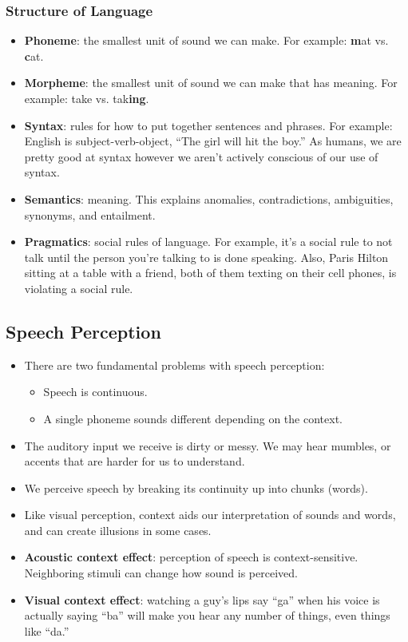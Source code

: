 \documentclass[]{article}
\begin{document}
			\subsubsection{Structure of Language}
				\begin{itemize}
					\item \textbf{Phoneme}: the smallest unit of sound we can make. For example: \textbf{m}at vs. \textbf{c}at.
					\item \textbf{Morpheme}: the smallest unit of sound we can make that has meaning. For example: take vs. tak\textbf{ing}.
					\item \textbf{Syntax}: rules for how to put together sentences and phrases. For example: English is subject-verb-object, ``The girl will hit the boy.'' As humans, we are pretty good at syntax however we aren't actively conscious of our use of syntax.
					\item \textbf{Semantics}: meaning. This explains anomalies, contradictions, ambiguities, synonyms, and entailment.
					\item \textbf{Pragmatics}: social rules of language. For example, it's a social rule to not talk until the person you're talking to is done speaking. Also, Paris Hilton sitting at a table with a friend, both of them texting on their cell phones, is violating a social rule.
				\end{itemize}

		\subsection{Speech Perception}
			\begin{itemize}
				\item There are two fundamental problems with speech perception:
					\begin{itemize}
						\item Speech is continuous.
						\item A single phoneme sounds different depending on the context.
					\end{itemize}
				\item The auditory input we receive is dirty or messy. We may hear mumbles, or accents that are harder for us to understand.
				\item We perceive speech by breaking its continuity up into chunks (words). 
				\item Like visual perception, context aids our interpretation of sounds and words, and can create illusions in some cases.
				\item \textbf{Acoustic context effect}: perception of speech is context-sensitive. Neighboring stimuli can change how sound is perceived.
				\item \textbf{Visual context effect}: watching a guy's lips say ``ga'' when his voice is actually saying ``ba'' will make you hear any number of things, even things like ``da.''
			\end{itemize}
\end{document}

